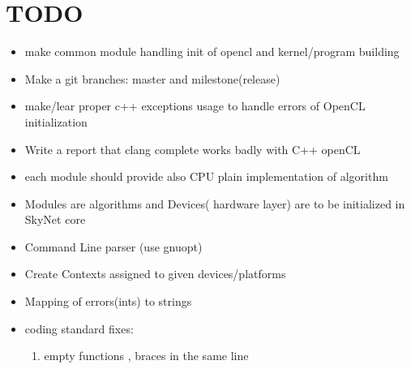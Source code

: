 \documentclass[a4paper,10pt]{article}
\begin{document}
\section{TODO}
\begin{itemize}
\item make common module handling init of opencl and kernel/program building
\item Make a git branches: master and milestone(release)
\item make/lear proper c++ exceptions usage to handle errors of OpenCL initialization
\item Write a report that clang complete works badly with C++ openCL
\item each module should provide also CPU plain implementation of algorithm
\item Modules are algorithms and Devices( hardware layer) are to be initialized in SkyNet core
\item Command Line parser (use gnuopt)
\item Create Contexts assigned to given devices/platforms
\item Mapping of errors(ints) to strings
\item coding standard fixes:
\begin{enumerate}
\item empty functions , braces in the same line
\end{enumerate}
\end{itemize}
\end{document}
